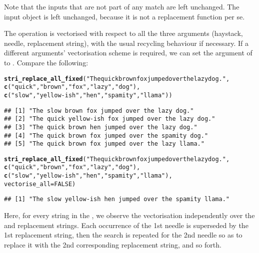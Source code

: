 \documentclass[nojss]{jss}\usepackage[]{graphicx}\usepackage[]{xcolor}
\makeatletter
\newcommand{\hlnum}[1]{\textcolor[rgb]{0.686,0.059,0.569}{#1}}%
\newcommand{\hlstr}[1]{\textcolor[rgb]{0.192,0.494,0.8}{#1}}%
\newcommand{\hlstd}[1]{\textcolor[rgb]{0.345,0.345,0.345}{#1}}%
\newcommand{\hlkwc}[1]{\textcolor[rgb]{0.333,0.667,0.333}{#1}}%
\newcommand{\hlkwd}[1]{\textcolor[rgb]{0.737,0.353,0.396}{\textbf{#1}}}%
\newenvironment{kframe}{%
 \def\at@end@of@kframe{}%
 \ifinner\ifhmode%
  \def\at@end@of@kframe{\end{minipage}}%
  \begin{minipage}{\columnwidth}%
 \fi\fi%
 \def\FrameCommand##1{\hskip\@totalleftmargin \hskip-\fboxsep
 \colorbox{shadecolor}{##1}\hskip-\fboxsep
     \hskip-\linewidth \hskip-\@totalleftmargin \hskip\columnwidth}%
 \MakeFramed {\advance\hsize-\width
   \@totalleftmargin\z@ \linewidth\hsize
   \@setminipage}}%
 {\par\unskip\endMakeFramed%
 \at@end@of@kframe}
\newenvironment{knitrout}{}{} %
\makeatother
\begin{document}
Note that the inputs that are not part of any match are left unchanged.
The input object is left unchanged, because it is not a replacement
function per se.

The operation is vectorised with respect to all the three arguments
(haystack, needle, replacement string),
with the usual recycling behaviour if necessary.
If a different arguments' vectorisation scheme is required,
we can set the  argument of 
to .
Compare the following:

\begin{knitrout}
\color{fgcolor}\begin{kframe}
\begin{alltt}
\hlkwd{stri_replace_all_fixed}\hlstd{(}\hlstr{"The quick brown fox jumped over the lazy dog."}\hlstd{,}
  \hlkwd{c}\hlstd{(}\hlstr{"quick"}\hlstd{,} \hlstr{"brown"}\hlstd{,}      \hlstr{"fox"}\hlstd{,} \hlstr{"lazy"}\hlstd{,}    \hlstr{"dog"}\hlstd{),}
  \hlkwd{c}\hlstd{(}\hlstr{"slow"}\hlstd{,}  \hlstr{"yellow-ish"}\hlstd{,} \hlstr{"hen"}\hlstd{,} \hlstr{"spamity"}\hlstd{,} \hlstr{"llama"}\hlstd{))}
\end{alltt}
\begin{verbatim}
## [1] "The slow brown fox jumped over the lazy dog."      
## [2] "The quick yellow-ish fox jumped over the lazy dog."
## [3] "The quick brown hen jumped over the lazy dog."     
## [4] "The quick brown fox jumped over the spamity dog."  
## [5] "The quick brown fox jumped over the lazy llama."
\end{verbatim}
\begin{alltt}
\hlkwd{stri_replace_all_fixed}\hlstd{(}\hlstr{"The quick brown fox jumped over the lazy dog."}\hlstd{,}
  \hlkwd{c}\hlstd{(}\hlstr{"quick"}\hlstd{,} \hlstr{"brown"}\hlstd{,}      \hlstr{"fox"}\hlstd{,} \hlstr{"lazy"}\hlstd{,} \hlstr{"dog"}\hlstd{),}
  \hlkwd{c}\hlstd{(}\hlstr{"slow"}\hlstd{,}  \hlstr{"yellow-ish"}\hlstd{,} \hlstr{"hen"}\hlstd{,} \hlstr{"spamity"}\hlstd{,} \hlstr{"llama"}\hlstd{),}
  \hlkwc{vectorise_all}\hlstd{=}\hlnum{FALSE}\hlstd{)}
\end{alltt}
\begin{verbatim}
## [1] "The slow yellow-ish hen jumped over the spamity llama."
\end{verbatim}
\end{kframe}
\end{knitrout}

\noindent
Here, for every string in the , we observe the vectorisation
independently over the  and replacement strings.
Each occurrence of the 1st needle is superseded by the 1st replacement
string, then the search is repeated for the 2nd needle so as to replace
it with the 2nd corresponding replacement string, and so forth.
\end{document}

